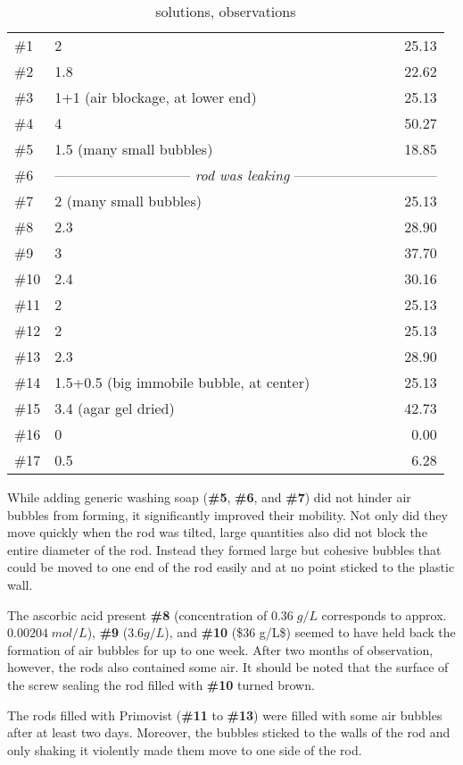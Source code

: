 \begin{table}[]
\begin{tabular}{l|lr}
\toprule
\#1   & 2					& 25.13				\\
\#2   & 1.8					& 22.62				\\
\#3   & 1+1 (air blockage, at lower end)	& 25.13				\\
\#4   & 4					& 50.27				\\
\#5   & 1.5 (many small bubbles)		& 18.85				\\
\#6   & \multicolumn{2}{c}{-----------------------------\textit{ rod was leaking }------------------------------}\\
\#7   & 2 (many small bubbles)			& 25.13				\\
\#8   & 2.3					& 28.90				\\
\#9   & 3					& 37.70				\\
\#10  & 2.4					& 30.16				\\
\#11  & 2					& 25.13				\\
\#12  & 2					& 25.13				\\
\#13  & 2.3					& 28.90				\\
\#14  & 1.5+0.5 (big immobile bubble, at center)	& 25.13				\\
\#15  & 3.4 (agar gel dried)			& 42.73				\\
\#16  & 0					& 0.00				\\
\#17  & 0.5					& 6.28				\\
\bottomrule
\end{tabular}
\caption{solutions, observations}
\label{tab:bubbles}
\end{table}


While adding generic washing soap (\textbf{\#5}, \textbf{\#6}, and \textbf{\#7}) did not hinder air bubbles from forming, it significantly improved their mobility.
Not only did they move quickly when the rod was tilted, large quantities also did not block the entire diameter of the rod.
Instead they formed large but cohesive bubbles that could be moved to one end of the rod easily and at no point sticked to the plastic wall.

The ascorbic acid present \textbf{\#8} (concentration of $0.36 \; g/L$ corresponds to approx. $0.00204 \; mol/L$), \textbf{\#9} ($3.6 g/L$), and \textbf{\#10} (\$36 g/L\$) seemed to have held back the formation of air bubbles for up to one week.
After two months of observation, however, the rods also contained some air.
It should be noted that the surface of the screw sealing the rod filled with \textbf{\#10} turned brown.

The rods filled with Primovist (\textbf{\#11} to \textbf{\#13}) were filled with some air bubbles after at least two days.
Moreover, the bubbles sticked to the walls of the rod and only shaking it violently made them move to one side of the rod.

